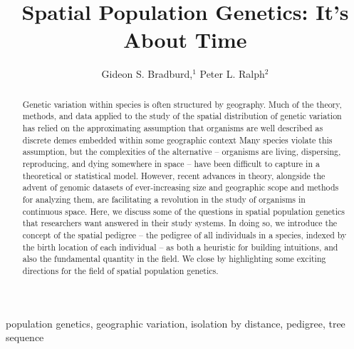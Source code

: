 \documentclass{ar-1col}
\newcommand{\todo}[1]{{\textbf{\color{red}{#1}}}}
\begin{document}

\title{Spatial Population Genetics: It's About Time}


\author{Gideon S. Bradburd,$^1$ Peter L. Ralph$^2$
}

\begin{abstract}
\todo{read through and edit}

Genetic variation within species is often structured by geography.
Much of the theory, methods, and data applied to the study 
of the spatial distribution of genetic variation 
has relied on the approximating assumption that 
organisms are well described as discrete demes  
embedded within some geographic context
Many species violate this assumption, 
but the complexities of the alternative -- 
organisms are living, dispersing, reproducing, and dying 
somewhere in space -- 
have been difficult to capture in a theoretical or statistical model.
However, recent advances in theory, 
alongside the advent of genomic datasets 
of ever-increasing size and geographic scope 
and methods for analyzing them,
are facilitating a revolution in the study of organisms in continuous space.
Here, we discuss some of the questions in spatial population genetics 
that researchers want answered in their study systems.
In doing so, we introduce the concept of the spatial pedigree -- 
the pedigree of all individuals in a species, 
indexed by the birth location of each individual
--
as both a heuristic for building intuitions, 
and also the fundamental quantity in the field.
We close by highlighting some exciting directions 
for the field of spatial population genetics.
\end{abstract}

\begin{keywords}
population genetics, geographic variation, isolation by distance, pedigree, tree sequence
\end{keywords}
\maketitle
\end{document}
